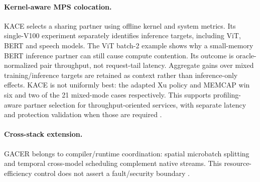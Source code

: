 \paragraph{Kernel-aware MPS colocation.} KACE selects a sharing partner using offline kernel and system metrics. Its single-V100 experiment separately identifies inference targets, including ViT, BERT and speech models. The ViT batch-2 example shows why a small-memory BERT inference partner can still cause compute contention. Its outcome is oracle-normalized pair throughput, not request-tail latency. Aggregate gains over mixed training/inference targets are retained as context rather than inference-only effects. KACE is not uniformly best: the adapted Xu policy and MEMCAP win six and two of the 21 mixed-mode cases respectively. This supports profiling-aware partner selection for throughput-oriented services, with separate latency and protection validation when those are required \cite{s030}.
\paragraph{Cross-stack extension.} GACER belongs to compiler/runtime coordination: spatial microbatch splitting and temporal cross-model scheduling complement native streams. This resource-efficiency control does not assert a fault/security boundary \cite{s027}.
